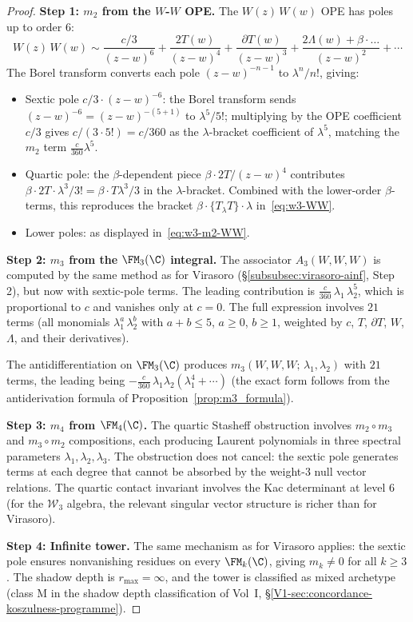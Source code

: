 \begin{proof}
\textbf{Step 1: $m_2$ from the $W$-$W$ OPE.}
The $W(z)\, W(w)$ OPE has poles up to order $6$:
\[
W(z)\, W(w) \sim
\frac{c/3}{(z-w)^6}
+ \frac{2T(w)}{(z-w)^4}
+ \frac{\partial T(w)}{(z-w)^3}
+ \frac{2\Lambda(w) + \beta \cdot \ldots}{(z-w)^2}
+ \cdots
\]
The Borel transform converts each pole
$(z-w)^{-n-1}$ to $\lambda^n/n!$, giving:
\begin{itemize}
\item Sextic pole $c/3 \cdot (z-w)^{-6}$:
 the Borel transform sends $(z{-}w)^{-6} = (z{-}w)^{-(5+1)}$
 to $\lambda^5/5!$; multiplying by the OPE coefficient $c/3$
 gives $c/(3 \cdot 5!) = c/360$ as the $\lambda$-bracket
 coefficient of $\lambda^5$, matching the $m_2$ term
 $\frac{c}{360}\lambda^5$.
\item Quartic pole: the $\beta$-dependent piece
 $\beta \cdot 2T/(z{-}w)^4$ contributes
 $\beta \cdot 2T \cdot \lambda^3/3! = \beta \cdot
 T\lambda^3/3$ in the $\lambda$-bracket. Combined
 with the lower-order $\beta$-terms, this reproduces
 the bracket $\beta \cdot \{T{}_\lambda T\} \cdot \lambda$
 in~\eqref{eq:w3-WW}.
\item Lower poles: as displayed
 in~\eqref{eq:w3-m2-WW}.
\end{itemize}

\medskip
\textbf{Step 2: $m_3$ from the $\FM_3(\C)$ integral.}
The associator $A_3(W,W,W)$ is computed by the
same method as for Virasoro
(\S\ref{subsubsec:virasoro-ainf}, Step 2), but now
with sextic-pole terms. The leading contribution is
$\frac{c}{360}\,\lambda_1\,\lambda_2^5$, which is
proportional to $c$ and vanishes only at $c = 0$.
The full expression involves $21$ terms
(all monomials $\lambda_1^a\, \lambda_2^b$ with
$a + b \le 5$, $a \ge 0$, $b \ge 1$, weighted by
$c$, $T$, $\partial T$, $W$, $\Lambda$, and their
derivatives).

The antidifferentiation on $\FM_3(\C)$ produces
$m_3(W,W,W;\, \lambda_1, \lambda_2)$ with $21$
terms, the leading being
$-\frac{c}{360}\,\lambda_1\lambda_2
(\lambda_1^4 + \cdots)$
(the exact form follows from the antiderivation
formula of Proposition~\ref{prop:m3_formula}).

\medskip
\textbf{Step 3: $m_4$ from $\FM_4(\C)$.}
The quartic Stasheff obstruction involves $m_2 \circ m_3$
and $m_3 \circ m_2$ compositions, each producing
Laurent polynomials in three spectral parameters
$\lambda_1, \lambda_2, \lambda_3$. The obstruction does
not cancel: the sextic pole generates terms at each
degree that cannot be absorbed by the weight-$3$ null
vector relations. The quartic contact invariant
involves the Kac determinant at level $6$ (for the
$\mathcal{W}_3$ algebra, the relevant singular vector
structure is richer than for Virasoro).

\medskip
\textbf{Step 4: Infinite tower.}
The same mechanism as for Virasoro applies: the sextic
pole ensures nonvanishing residues on every
$\FM_k(\C)$, giving $m_k \ne 0$ for all $k \ge 3$.
The shadow depth is $r_{\max} = \infty$, and the
tower is classified as mixed archetype (class M in
the shadow depth classification of Vol~I,
\S\ref*{V1-sec:concordance-koszulness-programme}).
\end{proof}

